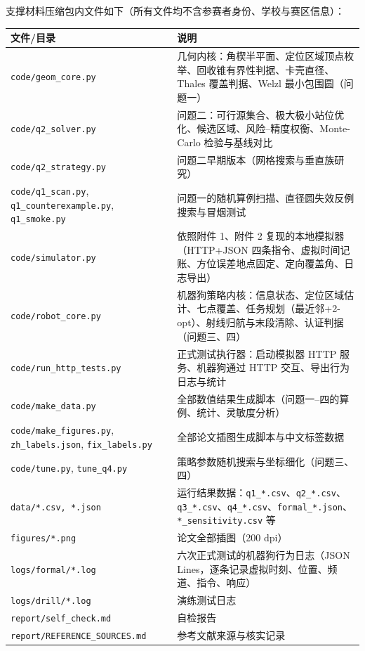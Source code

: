 \documentclass[withoutpreface,bwprint]{cumcmthesis}
\begin{document}
支撑材料压缩包内文件如下（所有文件均不含参赛者身份、学校与赛区信息）：

\begin{longtable}{p{6.6cm}p{8.4cm}}
\toprule
文件/目录 & 说明\\
\midrule
\endhead
\texttt{code/geom\_core.py} & 几何内核：角楔半平面、定位区域顶点枚举、回收锥有界性判据、卡壳直径、Thales 覆盖判据、Welzl 最小包围圆（问题一）\\
\texttt{code/q2\_solver.py} & 问题二：可行源集合、极大极小站位优化、候选区域、风险--精度权衡、Monte-Carlo 检验与基线对比\\
\texttt{code/q2\_strategy.py} & 问题二早期版本（网格搜索与垂直族研究）\\
\texttt{code/q1\_scan.py}, \texttt{q1\_counterexample.py}, \texttt{q1\_smoke.py} & 问题一的随机算例扫描、直径圆失效反例搜索与冒烟测试\\
\texttt{code/simulator.py} & 依照附件 1、附件 2 复现的本地模拟器（HTTP+JSON 四条指令、虚拟时间记账、方位误差地点固定、定向覆盖角、日志导出）\\
\texttt{code/robot\_core.py} & 机器狗策略内核：信息状态、定位区域估计、七点覆盖、任务规划（最近邻+2-opt）、射线归航与末段清除、认证判据（问题三、四）\\
\texttt{code/run\_http\_tests.py} & 正式测试执行器：启动模拟器 HTTP 服务、机器狗通过 HTTP 交互、导出行为日志与统计\\
\texttt{code/make\_data.py} & 全部数值结果生成脚本（问题一--四的算例、统计、灵敏度分析）\\
\texttt{code/make\_figures.py}, \texttt{zh\_labels.json}, \texttt{fix\_labels.py} & 全部论文插图生成脚本与中文标签数据\\
\texttt{code/tune.py}, \texttt{tune\_q4.py} & 策略参数随机搜索与坐标细化（问题三、四）\\
\texttt{data/*.csv, *.json} & 运行结果数据：\texttt{q1\_*.csv}、\texttt{q2\_*.csv}、\texttt{q3\_*.csv}、\texttt{q4\_*.csv}、\texttt{formal\_*.json}、\texttt{*\_sensitivity.csv} 等\\
\texttt{figures/*.png} & 论文全部插图（200 dpi）\\
\texttt{logs/formal/*.log} & 六次正式测试的机器狗行为日志（JSON Lines，逐条记录虚拟时刻、位置、频道、指令、响应）\\
\texttt{logs/drill/*.log} & 演练测试日志\\
\texttt{report/self\_check.md} & 自检报告\\
\texttt{report/REFERENCE\_SOURCES.md} & 参考文献来源与核实记录\\
\bottomrule
\end{longtable}
\end{document}
